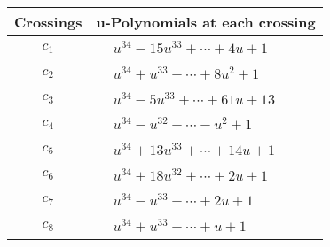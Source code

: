 \documentclass[1p]{elsarticle_modified}
\theoremstyle{definition}
\begin{document}
\begin{tabular}{m{50pt}|m{274pt}}
Crossings & \hspace{64pt}u-Polynomials at each crossing \\
\hline $$\begin{aligned}c_{1}\end{aligned}$$&$\begin{aligned}
&u^{34}-15 u^{33}+\cdots+4 u+1
\end{aligned}$\\
\hline $$\begin{aligned}c_{2}\end{aligned}$$&$\begin{aligned}
&u^{34}+u^{33}+\cdots+8 u^2+1
\end{aligned}$\\
\hline $$\begin{aligned}c_{3}\end{aligned}$$&$\begin{aligned}
&u^{34}-5 u^{33}+\cdots+61 u+13
\end{aligned}$\\
\hline $$\begin{aligned}c_{4}\end{aligned}$$&$\begin{aligned}
&u^{34}- u^{32}+\cdots- u^2+1
\end{aligned}$\\
\hline $$\begin{aligned}c_{5}\end{aligned}$$&$\begin{aligned}
&u^{34}+13 u^{33}+\cdots+14 u+1
\end{aligned}$\\
\hline $$\begin{aligned}c_{6}\end{aligned}$$&$\begin{aligned}
&u^{34}+18 u^{32}+\cdots+2 u+1
\end{aligned}$\\
\hline $$\begin{aligned}c_{7}\end{aligned}$$&$\begin{aligned}
&u^{34}- u^{33}+\cdots+2 u+1
\end{aligned}$\\
\hline $$\begin{aligned}c_{8}\end{aligned}$$&$\begin{aligned}
&u^{34}+u^{33}+\cdots+u+1
\end{aligned}$\\

\end{tabular}
\end{document}
